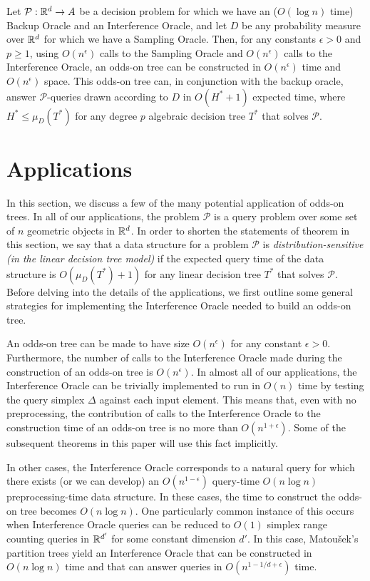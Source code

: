 \documentclass{patmorin}
\begin{document}
\begin{cor}
  Let $\mathcal{P}:\mathbb{R}^d\rightarrow A$ be a decision problem for which we
  have an ($O(\log n)$ time) Backup Oracle and an Interference Oracle,
  and let $D$ be any probability measure over $\mathbb{R}^d$ for which we have a
  Sampling Oracle.  Then, for any constants $\epsilon > 0$ and $p\ge 1$,
  using $O(n^\epsilon)$ calls to the Sampling Oracle and $O(n^\epsilon)$
  calls to the Interference Oracle, an odds-on tree can be constructed in
  $O(n^\epsilon)$ time and $O(n^\epsilon)$ space.  This odds-on tree can,
  in conjunction with the backup oracle, answer $\mathcal{P}$-queries
  drawn according to $D$ in $O(H^*+1)$ expected time, where $H^* \le
  \mu_D(T^*)$ for any degree $p$ algebraic decision tree $T^*$ that
  solves $\mathcal{P}$.
\end{cor}


\section{Applications}

In this section, we discuss a few of the many potential application of
odds-on trees.  In all of our applications, the problem $\mathcal{P}$ is a
query problem over some set of $n$ geometric objects in $\mathbb{R}^d$.  In order
to shorten the statements of theorem in this section, we say that a data
structure for a problem $\mathcal{P}$ is \emph{distribution-sensitive
(in the linear decision tree model)} if the expected query time of the
data structure is $O(\mu_D(T^*)+1)$ for any linear decision tree $T^*$
that solves $\mathcal{P}$. Before delving into the details of the
applications, we first outline some general strategies for implementing
the Interference Oracle needed to build an odds-on tree.

An odds-on tree can be made to have size $O(n^\epsilon)$ for any
constant $\epsilon > 0$.  Furthermore, the number of calls to the
Interference Oracle made during the construction of an odds-on tree is
$O(n^\epsilon)$.  In almost all of our applications, the Interference
Oracle can be trivially implemented to run in $O(n)$ time by testing
the query simplex $\Delta$ against each input element.  This means
that, even with no preprocessing, the contribution of calls to the
Interference Oracle to the construction time of an odds-on tree is no more
than $O(n^{1+\epsilon})$.  Some of the subsequent theorems in this paper
will use this fact implicitly.

In other cases, the Interference Oracle corresponds to a natural query for
which there exists (or we can develop) an $O(n^{1-\epsilon})$ query-time
$O(n\log n)$ preprocessing-time data structure.  In these cases, the time
to construct the odds-on tree becomes $O(n\log n)$.  One particularly
common instance of this occurs when Interference Oracle queries can
be reduced to $O(1)$ simplex range counting queries in $\mathbb{R}^{d'}$ for
some constant dimension $d'$.  In this case, Matou\v{s}ek's partition
trees \cite{m92} yield an Interference Oracle that can be constructed in
$O(n\log n)$ time and that can answer queries in $O(n^{1-1/d+\epsilon})$
time. 
\end{document}
